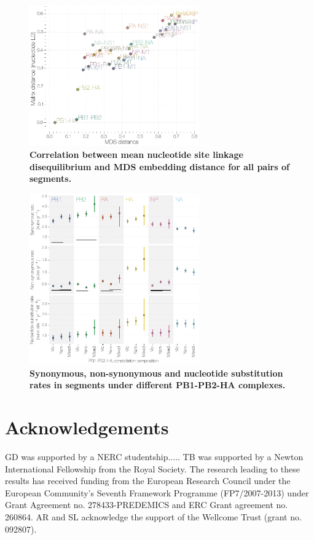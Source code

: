 \documentclass[11pt,oneside,letterpaper]{article}
\begin{document}
\begin{figure}
\centering  
\includegraphics[width=0.65\textwidth]  {supp_figures/InfB_ntLD_MatrixMDScorr.png}
\caption{\textbf{Correlation between mean nucleotide site linkage disequilibrium and MDS embedding distance for all pairs of segments.}}
\label{MDSntCorr}
\end{figure}

\begin{figure}
\centering  
\includegraphics[width=0.65\textwidth]  {supp_figures/InfB_robustCounting.png}
\caption{\textbf{Synonymous, non-synonymous and nucleotide substitution rates in segments under different PB1-PB2-HA complexes.}}
\label{robustCounting}
\end{figure}

\section*{Acknowledgements}
GD was supported by a NERC studentship..... 
TB was supported by a Newton International Fellowship from the Royal Society. 
The research leading to these results has received funding from the European Research Council under the European Community's Seventh Framework Programme (FP7/2007-2013) under Grant Agreement no. 278433-PREDEMICS and ERC Grant agreement no. 260864.
AR and SL acknowledge the support of the Wellcome Trust (grant no. 092807).



\end{document}
